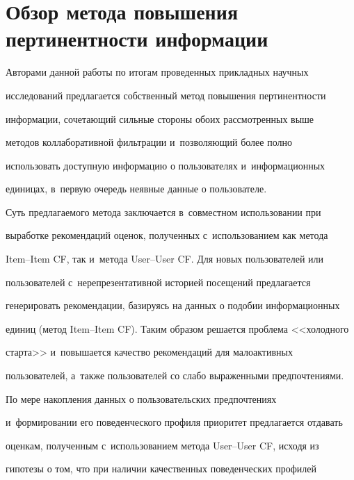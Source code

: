   


\section{Обзор метода повышения пертинентности информации}





\vspace*{-2pt}





  Авторами данной работы по итогам проведенных прикладных научных 


исследований предлагается собственный метод повышения пертинентности 


информации, сочетающий сильные стороны обоих рассмотренных выше 


методов коллаборативной фильтрации и~позволяющий более полно 


использовать доступную информацию о пользователях и~информационных 


единицах, в~первую очередь неявные данные о пользователе. 


  


  Суть предлагаемого метода заключается в~совместном использовании при 


выработке рекомендаций оценок, полученных с~использованием как метода 


Item--Item CF, так и~метода User--User CF. Для новых пользователей или 


пользователей с~нерепрезентативной историей посещений предлагается 


генерировать рекомендации, базируясь на данных о подобии информационных 


единиц (метод Item--Item CF). Таким образом решается проблема <<холодного 


старта>> и~повышается качество рекомендаций для малоактивных 


пользователей, а~также пользователей со слабо выраженными предпочтениями. 


По мере накопления данных о пользовательских предпочтениях 


и~формировании его поведенческого профиля приоритет предлагается отдавать 


оценкам, полученным с~использованием метода User--User CF, исходя из 


гипотезы о том, что при наличии качественных поведенческих профилей 


